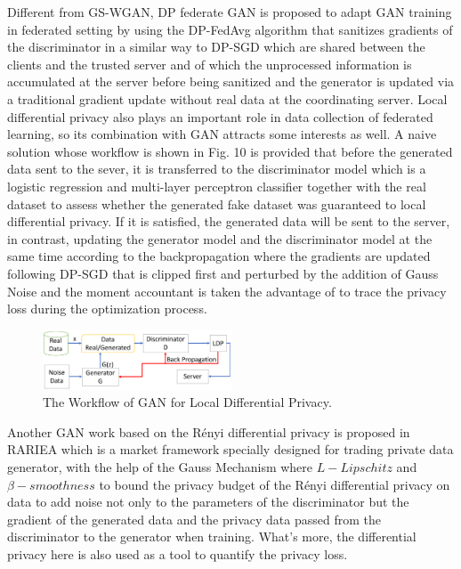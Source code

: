 \documentclass[conference]{IEEEtran}
\begin{document}
Different from GS-WGAN, DP federate GAN\cite{b42} is proposed to adapt GAN training in federated setting by using the DP-FedAvg algorithm that sanitizes gradients of the discriminator in a similar way to DP-SGD which are shared between the clients and the trusted server and of which the unprocessed information is accumulated at the server before being sanitized and the generator is updated via a traditional gradient update without real data at the coordinating server. Local differential privacy also plays an important role in data collection of federated learning, so its combination with GAN attracts some interests as well. A naive solution\cite{b43} whose workflow is shown in Fig. 10 is provided that before the generated data sent to the sever, it is transferred to the discriminator model which is a logistic regression and multi-layer perceptron classifier together with the real dataset to assess whether the generated fake dataset was guaranteed to local differential privacy. If it is satisfied, the generated data will be sent to the server, in contrast, updating the generator model and the discriminator model at the same time according to the backpropagation where the gradients are updated following DP-SGD that is clipped first and perturbed by the addition of Gauss Noise and the moment accountant is taken the advantage of to trace the privacy loss during the optimization process.
\begin{figure}[htbp]
    \centerline{\includegraphics[width=0.5\textwidth,height=0.15\textwidth]{The Workflow of GAN for Local Differential Privacy.png}}
    \caption{The Workflow of GAN for Local Differential Privacy.}
    \label{fig10}
\end{figure}

Another GAN work based on the Rényi differential privacy is proposed in RARIEA\cite{b44} which is a market framework specially designed for trading private data generator, with the help of the Gauss Mechanism where $L-Lipschitz$ and $\beta-smoothness$ to bound the privacy budget of the Rényi differential privacy on data to add noise not only to the parameters of the discriminator but the gradient of the generated data and the privacy data passed from the discriminator to the generator when training. What's more, the differential privacy here is also used as a tool to quantify the privacy loss. 
\end{document}
